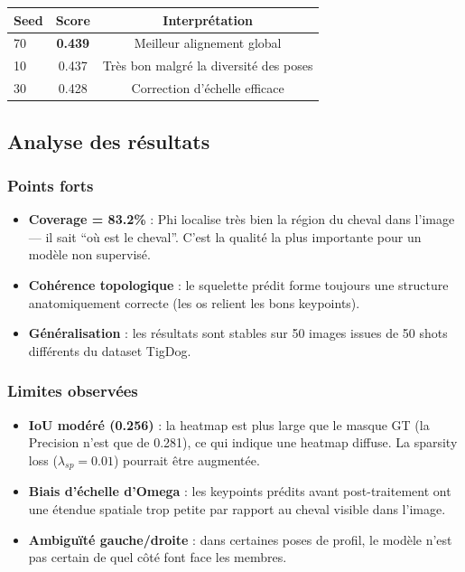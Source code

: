 \documentclass[12pt,a4paper]{article}
\begin{document}
\begin{resultbox}
\begin{center}
\begin{tabular}{lcc}
\toprule
\textbf{Seed} & \textbf{Score} & \textbf{Interprétation} \\
\midrule
70 & \textbf{0.439} & Meilleur alignement global \\
10 & 0.437 & Très bon malgré la diversité des poses \\
30 & 0.428 & Correction d'échelle efficace \\
\bottomrule
\end{tabular}
\end{center}
\end{resultbox}

\subsection{Analyse des résultats}

\subsubsection*{Points forts}

\begin{itemize}
  \item \textbf{Coverage = 83.2\%} : Phi localise très bien la région du cheval dans
  l'image --- il sait ``où est le cheval''. C'est la qualité la plus importante pour
  un modèle non supervisé.
  \item \textbf{Cohérence topologique} : le squelette prédit forme toujours une
  structure anatomiquement correcte (les os relient les bons keypoints).
  \item \textbf{Généralisation} : les résultats sont stables sur 50 images issues
  de 50 shots différents du dataset TigDog.
\end{itemize}

\subsubsection*{Limites observées}

\begin{itemize}
  \item \textbf{IoU modéré (0.256)} : la heatmap est plus large que le masque GT
  (la Precision n'est que de 0.281), ce qui indique une heatmap diffuse. La sparsity
  loss ($\lambda_{sp} = 0.01$) pourrait être augmentée.
  \item \textbf{Biais d'échelle d'Omega} : les keypoints prédits avant post-traitement
  ont une étendue spatiale trop petite par rapport au cheval visible dans l'image.
  \item \textbf{Ambiguïté gauche/droite} : dans certaines poses de profil, le modèle
  n'est pas certain de quel côté font face les membres.
\end{itemize}
\end{document}
